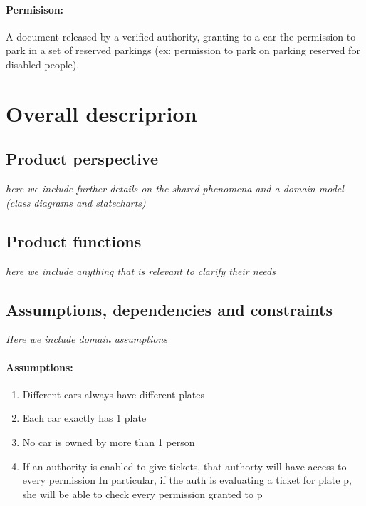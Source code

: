 \documentclass{article}
\newcommand{\enum}[1]{\texttt{#1.\arabic*}}
\begin{document}
		\paragraph{Permisison:}A document released by a verified authority, granting to a car the permission to park in a set of reserved parkings (ex: permission to park on parking reserved for disabled people). 
		
\section{Overall descriprion}
	\subsection{Product perspective} \textit{here we include further details on the shared phenomena and a domain model (class diagrams and statecharts)}
	\subsection{Product functions}\textit{here we include anything that is relevant to clarify their needs}
	\subsection{Assumptions, dependencies and constraints} \textit{Here we include domain assumptions}
	\paragraph{Assumptions:}
	\begin{enumerate}[label=\enum{A}]
		\item Different cars always have different plates
		\item Each car exactly has 1 plate
		\item No car is owned by more than 1 person
		\item If an authority is enabled to give tickets, that authorty will have access to every permission
			\subitem In particular, if the auth is evaluating a ticket for plate p, she will be able to check every permission granted to p
	\end{enumerate}
\end{document}
